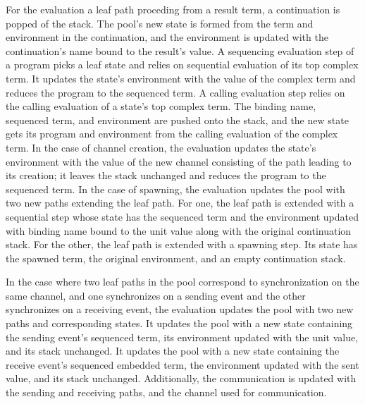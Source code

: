 \documentclass[letterpaper, 11pt]{extarticle}
\begin{document}
For the evaluation a leaf path proceding from a result term, a continuation is popped of the
stack. The pool's new state is formed from the term and environment in the continuation, and
the environment is updated with the continuation's name bound to the result's value.
A sequencing evaluation step of a program picks a leaf state and relies on
sequential evaluation of its top complex term. It updates the state's environment with the
value of the complex term and reduces the program to the sequenced term.
A calling evaluation step relies on the calling evaluation of a state's top
complex term. The binding name, sequenced term, and environment are pushed onto the stack,
and the new state gets its program and environment from the calling evaluation of the complex term. 
In the case of channel creation, the evaluation updates the state's environment with the
value of the new channel consisting of the path leading to its creation; it leaves the stack
unchanged and reduces the program to the sequenced term.
In the case of spawning, the evaluation updates the pool with two
new paths extending the leaf path. For one, the leaf path is extended with a sequential
step whose state has the sequenced term and the environment updated
with binding name bound to the unit value along with the original continuation stack.
For the other, the leaf path is
extended with a spawning step.
Its state has the spawned term, the original environment, and an empty continuation stack. 

In the case where two leaf paths in the pool correspond to synchronization on the same channel,
and one synchronizes on a sending event and the other synchronizes on a receiving event, the
evaluation updates the pool with two new paths and corresponding states.
It updates the pool with a new state containing the sending event's sequenced term, its environment updated with the unit value, and its stack unchanged.
It updates the pool with a new state containing the receive event's sequenced embedded term,
the environment updated with the sent value, and its stack unchanged.
Additionally, the communication is updated with the sending and receiving paths,
and the channel used for communication. 
\end{document}
